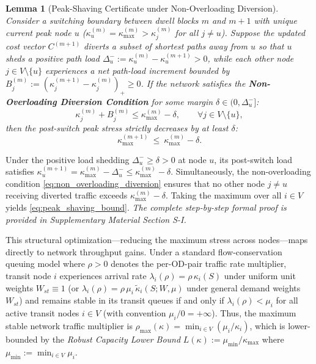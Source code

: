 \documentclass[journal]{IEEEtran}
\theoremstyle{plain}
\newtheorem{lemma}{Lemma}
\theoremstyle{definition}
\newcommand{\rev}[1]{{\color{blue}#1}}
\begin{document}
\begin{lemma}[\rev{Peak-Shaving Certificate under Non-Overloading Diversion}]
\label{lem:block-budget}
\rev{Consider a switching boundary between dwell blocks $m$ and $m+1$ with unique current peak node $u$ ($\kappa_u^{(m)} = \kappa_{\max}^{(m)} > \kappa_j^{(m)}$ for all $j \neq u$). Suppose the updated cost vector $C^{(m+1)}$ diverts a subset of shortest paths away from $u$ so that $u$ sheds a positive path load $\Delta_u^- := \kappa_u^{(m)} - \kappa_u^{(m+1)} > 0$, while each other node $j \in V \setminus \{u\}$ experiences a net path-load increment bounded by $B_j^{(m)} := (\kappa_j^{(m+1)} - \kappa_j^{(m)})_+ \ge 0$. If the network satisfies the \textbf{Non-Overloading Diversion Condition} for some margin $\delta \in (0, \Delta_u^-]$:
\begin{equation}\label{eq:non_overloading_diversion}
\kappa_j^{(m)} + B_j^{(m)} \le \kappa_{\max}^{(m)} - \delta, \qquad \forall j \in V \setminus \{u\},
\end{equation}
then the post-switch peak stress strictly decreases by at least $\delta$:
\begin{equation}\label{eq:peak_shaving_bound}
\kappa^{(m+1)}_{\max}\ \le\ \kappa^{(m)}_{\max} - \delta.
\end{equation}}
\end{lemma}
\begin{IEEEproof}
Under the positive load shedding $\Delta_u^- \ge \delta > 0$ at node $u$, its post-switch load satisfies $\kappa_u^{(m+1)} = \kappa_{\max}^{(m)} - \Delta_u^- \le \kappa_{\max}^{(m)} - \delta$. Simultaneously, the non-overloading condition \eqref{eq:non_overloading_diversion} ensures that no other node $j \neq u$ receiving diverted traffic exceeds $\kappa_{\max}^{(m)} - \delta$. Taking the maximum over all $i \in V$ yields \eqref{eq:peak_shaving_bound}. \textit{The complete step-by-step formal proof is provided in Supplementary Material Section S-I.}
\end{IEEEproof}

This structural optimization---reducing the maximum stress across nodes---maps directly to network throughput gains. 
\rev{Under a standard flow-conservation queuing model where $\rho > 0$ denotes the per-OD-pair traffic rate multiplier, transit node $i$ experiences arrival rate $\lambda_i(\rho) = \rho\,\kappa_i(S)$ under uniform unit weights $W_{st}\equiv 1$ (or $\lambda_i(\rho) = \rho\,\mu_i\,\widetilde{\kappa}_i(S;W,\mu)$ under general demand weights $W_{st}$) and remains stable in its transit queues if and only if $\lambda_i(\rho) < \mu_i$ for all active transit nodes $i \in V$ (with convention $\mu_i/0 = +\infty$). Thus, the maximum stable network traffic multiplier is $\rho_{\max}(\kappa) = \min_{i \in V} (\mu_i / \kappa_i)$, which is lower-bounded by the \textit{Robust Capacity Lower Bound} $L(\kappa) := \mu_{\min}/\kappa_{\max}$ where $\mu_{\min} := \min_{i \in V} \mu_i$.}
\end{document}
